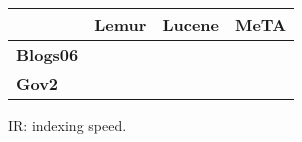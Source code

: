 \begin{figure}[t]
\centering
{\small
\begin{tabular}{|l|r|r|r|}
        \hline & \textbf{Lemur} & \textbf{Lucene} & \textbf{MeTA} \\
        \hline
        \textbf{Blogs06} & & & \\
        \textbf{Gov2}    & & & \\
        \hline
\end{tabular}
}
\caption{IR: indexing speed.}
\label{fig:ir-indexing}
\end{figure}
